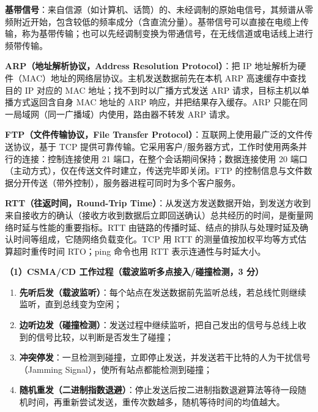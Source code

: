 \documentclass[a4paper,11pt]{article}
\begin{document}
\setcounter{question}{0}
\q \textbf{基带信号}：来自信源（如计算机、话筒）的、未经调制的原始电信号，其频谱从零频附近开始，包含较低的频率成分（含直流分量）。基带信号可以直接在电缆上传输，称为基带传输；也可以先经调制变换为带通信号，在无线信道或电话线上进行频带传输。

\q \textbf{ARP（地址解析协议，Address Resolution Protocol）}：把 IP 地址解析为硬件（MAC）地址的网络层协议。主机发送数据前先在本机 ARP 高速缓存中查找目的 IP 对应的 MAC 地址；找不到时以广播方式发送 ARP 请求，目标主机以单播方式返回含自身 MAC 地址的 ARP 响应，并把结果存入缓存。ARP 只能在同一局域网（同一广播域）内使用，路由器不转发 ARP 请求。

\q \textbf{FTP（文件传输协议，File Transfer Protocol）}：互联网上使用最广泛的文件传送协议，基于 TCP 提供可靠传输。它采用客户/服务器方式，工作时使用两条并行的连接：控制连接使用 21 端口，在整个会话期间保持；数据连接使用 20 端口（主动方式），仅在传送文件时建立，传送完毕即关闭。FTP 的控制信息与文件数据分开传送（带外控制），服务器进程可同时为多个客户服务。

\q \textbf{RTT（往返时间，Round-Trip Time）}：从发送方发送数据开始，到发送方收到来自接收方的确认（接收方收到数据后立即回送确认）总共经历的时间，是衡量网络时延与性能的重要指标。RTT 由链路的传播时延、结点的排队与处理时延及确认时间等组成，它随网络负载变化。TCP 用 RTT 的测量值按加权平均等方式估算超时重传时间 RTO；ping 命令也用 RTT 表示连通性与时延大小。

\setcounter{question}{0}

\q \textbf{（1）CSMA/CD 工作过程（载波监听多点接入/碰撞检测，3 分）}
\begin{enumerate}[leftmargin=2em, itemsep=2pt, topsep=3pt]
  \item \textbf{先听后发（载波监听）}：每个站点在发送数据前先监听总线，若总线忙则继续监听，直到总线变为空闲；
  \item \textbf{边听边发（碰撞检测）}：发送过程中继续监听，把自己发出的信号与总线上收到的信号比较，以判断是否发生了碰撞；
  \item \textbf{冲突停发}：一旦检测到碰撞，立即停止发送，并发送若干比特的人为干扰信号（Jamming Signal），使所有站点都能检测到碰撞；
  \item \textbf{随机重发（二进制指数退避）}：停止发送后按二进制指数退避算法等待一段随机时间，再重新尝试发送，重传次数越多，随机等待时间的均值越大。
\end{enumerate}
\end{document}
